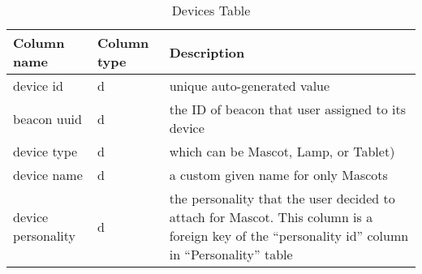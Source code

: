 	
\begin{table}
\centering
\begin{tabular}{ | m{8em} | m{6em}| m{17em} | } 
\hline
 Column name & Column type & Description \\ 
\hline 
device id & d & unique auto-generated value \\
\hline 
beacon uuid & d & the ID of beacon that user assigned to its device \\
\hline 
device type & d & which can be Mascot, Lamp, or Tablet) \\
\hline 
device name & d & a custom given name for only Mascots \\
\hline 
device personality & d & the personality that the user decided to attach for Mascot. This column is a foreign key of the “personality id” column in “Personality” table \\
\hline
\end{tabular}
\caption{Devices Table}
\end{table}
















   